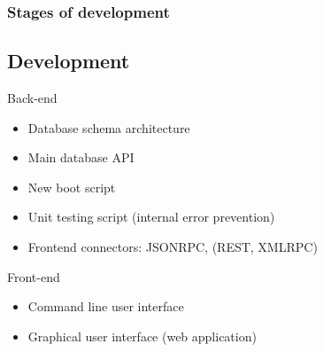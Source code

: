\documentclass{beamer}
\begin{document}
\begin{frame}
\frametitle{Stages of development}
\subsection{Development}

\begin{block}{Back-end}
\begin{itemize}
\item Database schema architecture
\item Main database API
\item New boot script
\item Unit testing script (internal error prevention)
\item Frontend connectors: JSONRPC, (REST, XMLRPC)
\end{itemize}
\end{block}
\begin{block}{Front-end}
\begin{itemize}
\item Command line user interface
\item Graphical user interface (web application)
\end{itemize}
\end{block}

\end{frame}
\end{document}
